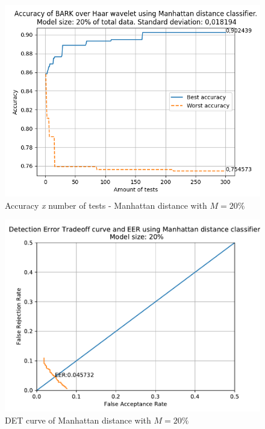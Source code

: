 \begin{figure}[H]
\centering
\includegraphics[scale=.6]{images/results/confusionMatrices/classifier_Manhattan_20.png}
\caption{Accuracy \textit{x} number of tests - Manhattan distance with $M=20\%$}
\label{fig:classifiermanhattan20}
\end{figure}
\begin{figure}[H]
\centering
\includegraphics[scale=.6]{images/results/det/DET_for_classifier_Manhattan_20}
\caption{DET curve of Manhattan distance with $M=20\%$}
\label{fig:detforclassifiermanhattan20}
\end{figure}
